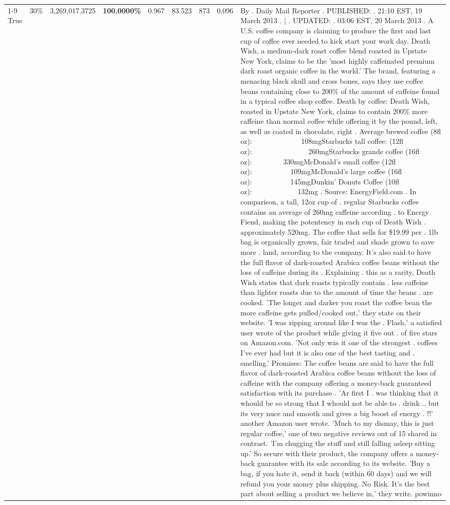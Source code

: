 \begin{table}[H]
{\begin{tabular}{lllrlllll}
\cline{1-9} \cline{2-9}
True & 30\% & 3,269,017.3725 & \bfseries \color{red} 100.0000\% & 0.967 & 83.523 & 873 & 0.096 & By . Daily Mail Reporter . PUBLISHED: . 21:10 EST, 19 March 2013 . | . UPDATED: . 03:06 EST, 20 March 2013 . A U.S. coffee company is claiming to produce the first and last cup of coffee ever needed to kick start your work day. Death Wish, a medium-dark roast coffee blend roasted in Upstate New York, claims to be the 'most highly caffeinated premium dark roast organic coffee in the world.' The brand, featuring a menacing black skull and cross bones, says they use coffee beans containing close to 200\% of the amount of caffeine found in a typical coffee shop coffee. Death by coffee: Death Wish, roasted in Upstate New York, claims to contain 200\% more caffeine than normal coffee while offering it by the pound, left, as well as coated in chocolate, right . Average brewed coffee (8fl oz):              108mgStarbucks tall coffee: (12fl oz):                260mgStarbucks grande coffee (16fl oz):         330mgMcDonald's small coffee (12fl oz):           109mgMcDonald's large coffee (16fl oz):           145mgDunkin' Donuts Coffee (10fl oz):             132mg . Source: EnergyField.com . In comparison, a tall, 12oz cup of . regular Starbucks coffee contains an average of 260mg caffeine according . to Energy Fiend, making the potentency in each cup of Death Wish . approximately 520mg. The coffee that sells for \$19.99 per . 1lb bag is organically grown, fair traded and shade grown to save more . land, according to the company. It's also said to have the full flavor of dark-roasted Arabica coffee beans without the loss of caffeine during its . Explaining . this as a rarity, Death Wish states that dark roasts typically contain . less caffeine than lighter roasts due to the amount of time the beans . are cooked. 'The longer and darker you roast the coffee bean the more caffeine gets pulled/cooked out,' they state on their website. 'I was zipping around like I was the . Flash,' a satisfied user wrote of the product while giving it five out . of five stars on Amazon.com. 'Not only was it one of the strongest . coffees I've ever had but it is also one of the best tasting and . smelling.’ Promises: The coffee beans are said to have the full flavor of dark-roasted Arabica coffee beans without the loss of caffeine with the company offering a money-back guaranteed satisfaction with its purchase . 'Ar first I . was thinking that it whould be so strong that I whould not be able to . drink .. but its very nuce and smooth and gives a big boost of energy . !!' another Amazon user wrote. 'Much to my dismay, this is just regular coffee,' one of two negative reviews out of 15 shared in contrast. 'I'm chugging the stuff and still falling asleep sitting up.' So secure with their product, the company offers a money-back guarantee with its sale according to its website. 'Buy a bag, if you hate it, send it back (within 60 days) and we will refund you your money plus shipping. No Risk. It’s the best part about selling a product we believe in,' they write. powinno \\

\end{tabular}}
\end{table}
